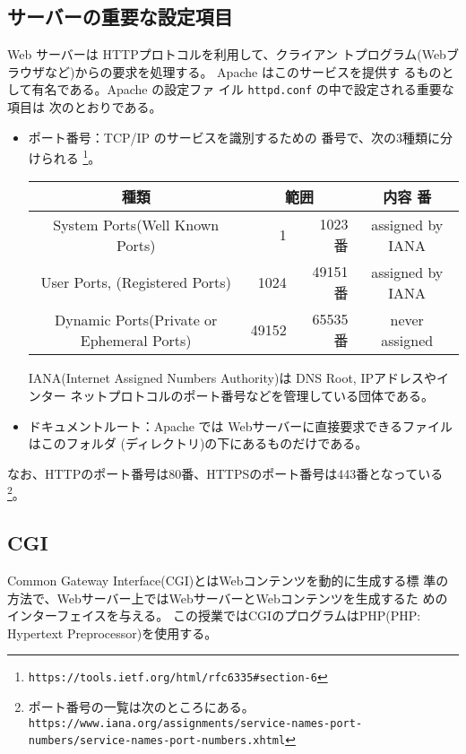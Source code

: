 \subsection{サーバーの重要な設定項目}
Web サーバーは HTTPプロトコルを利用して、クライアン
トプログラム(Webブラウザなど)からの要求を処理する。
%
Apache はこのサービスを提供す
るものとして有名である。Apache の設定ファ
イル \texttt{httpd.conf} の中で設定される重要な項目は
次のとおりである。
\begin{itemize}
 \item ポート番号：TCP/IP のサービスを識別するための
       番号で、次の3種類に分けられる
\footnote{\texttt{https://tools.ietf.org/html/rfc6335\#section-6}}。
\begin{center}\vspace{-\baselineskip}
 \begin{tabular}{|c|r@{番$\sim$}r<{番}|c|}
\hline
種類 &\multicolumn{2}{c|}{範囲} &内容 \\\hline
  System Ports(Well Known Ports)& 1&1023 & assigned by IANA\\ \hline
  User Ports, (Registered Ports)& 1024&49151 & assigned by IANA\\
  \hline
  Dynamic Ports(Private or Ephemeral Ports)& 49152& 65535&never assigned \\ \hline
 \end{tabular}
\end{center}
IANA(Internet Assigned Numbers Authority)は DNS Root, IPアドレスやインター
       ネットプロトコルのポート番号などを管理している団体である。


 \item ドキュメントルート：Apache では Webサーバーに直接要求できるファイルはこのフォルダ
       (ディレクトリ)の下にあるものだけである。
\end{itemize}
 なお、HTTPのポート番号は80番、HTTPSのポート番号は443番となっている\footnote{ポート番号の一覧は次のところにある。\\
%
 \texttt{https://www.iana.org/assignments/}\texttt{service-names-port-numbers/service-names-port-numbers.xhtml}}。


\subsection{CGI}
Common Gateway Interface(CGI)とはWebコンテンツを動的に生成する標
準の方法で、Webサーバー上ではWebサーバーとWebコンテンツを生成するた
めのインターフェイスを与える。
この授業ではCGIのプログラムはPHP(PHP:
%
Hypertext Preprocessor)を使用する。

